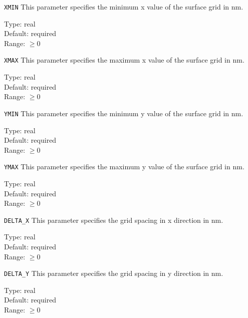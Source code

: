 \begin{keydescription}{\texttt{XMIN}}
This parameter specifies the minimum x value of the surface grid in nm.
\begin{keytab}
   Type:    \> real \\
   Default: \> required \\
   Range:   \> $\ge 0$
\end{keytab}
\end{keydescription}

\begin{keydescription}{\texttt{XMAX}}
This parameter specifies the maximum x value of the surface grid in nm.
\begin{keytab}
   Type:    \> real \\
   Default: \> required \\
   Range:   \> $\ge 0$
\end{keytab}
\end{keydescription}

\begin{keydescription}{\texttt{YMIN}}
This parameter specifies the minimum y value of the surface grid in nm.
\begin{keytab}
   Type:    \> real \\
   Default: \> required \\
   Range:   \> $\ge 0$
\end{keytab}
\end{keydescription}

\begin{keydescription}{\texttt{YMAX}}
This parameter specifies the maximum y value of the surface grid in nm.
\begin{keytab}
   Type:    \> real \\
   Default: \> required \\
   Range:   \> $\ge 0$
\end{keytab}
\end{keydescription}

\begin{keydescription}{\texttt{DELTA\_X}}
This parameter specifies the grid spacing in x direction in nm.
\begin{keytab}
   Type:    \> real \\
   Default: \> required \\
   Range:   \> $\ge 0$
\end{keytab}
\end{keydescription}

\begin{keydescription}{\texttt{DELTA\_Y}}
This parameter specifies the grid spacing in y direction in nm.
\begin{keytab}
   Type:    \> real \\
   Default: \> required \\
   Range:   \> $\ge 0$
\end{keytab}
\end{keydescription}

